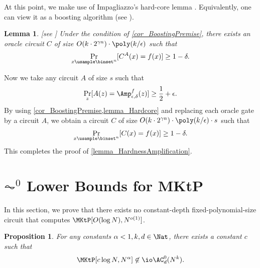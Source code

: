 \documentclass[11pt]{article}
\numberwithin{equation}{section}
\newtheorem{lemma}[theorem]{Lemma}
\newtheorem{proposition}[theorem]{Proposition}
\theoremstyle{definition}
\theoremstyle{plain}
\begin{document}
At this point, we make use of Impagliazzo's hard-core lemma \cite{Impagliazzo95_coco_conf}.
Equivalently, one can view it as a boosting algorithm
%
(see \cite{KlivansS03_ml_journals}).   %
\begin{lemma}
  [see   %
    \cite{Impagliazzo95_coco_conf, KlivansS03_ml_journals}]
  \label{lemma_Hardcore}
  Under the condition of \cref{cor_BoostingPremise},
  there exists an oracle circuit $C$ of size $O(k \cdot 2^{\gamma n}) \cdot \poly(k / \epsilon)$
  such that
  $$
    \Pr_{x \usample \binset^n} [ C^A(x) = f(x) ] \ge 1 - \delta.
  $$
\end{lemma}

Now we take any circuit $A$ of size $s$ such that
$$
  \Pr_{z} [  A(z) = \Amp_{\epsilon, \delta}^f(z) ] \ge \frac{1}{2} + \epsilon.
$$
By using \cref{cor_BoostingPremise,lemma_Hardcore}
and replacing each oracle gate by a circuit $A$,
we obtain a circuit $C$ of size $O(k \cdot 2^{\gamma n}) \cdot \poly(k / \epsilon) \cdot s$
such that
$$
  \Pr_{x \usample \binset^n} [ C(x) = f(x) ] \ge 1 - \delta.
$$
This completes the proof of \cref{lemma_HardnessAmplification}.

\section{\texorpdfstring{$\AC^0$}{AC0} Lower Bounds for MKtP}
\label{section_AC0MKtP}

In this section, we prove that there exists no constant-depth fixed-polynomial-size circuit that computes $\MKtP[O(\log N), N^{o(1)}]$.
\begin{proposition}
  \label{prop_AC0versusMKtP}
  For any constants $\alpha < 1, k, d \in \Nat$,
  there exists a constant $c$ such that
  $$\MKtP[c \log N, N^{\alpha}] \not\in \io \AC_d^0(N^k).$$
\end{proposition}
\end{document}
